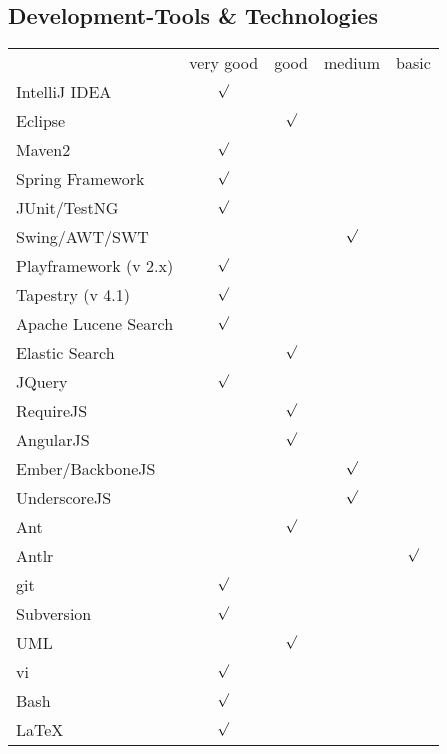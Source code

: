 \documentclass[11pt,a4paper,german]{moderncv}
\begin{document}
\subsection{Development-Tools \& Technologies}
{
\begin{tabular}{l*{4}{c}}
          & very good & good & medium & basic \\
IntelliJ IDEA & $ \surd $ & & & \\
Eclipse &  & $\surd$& &  \\
Maven2 &  $\surd$ & & & \\
Spring Framework &  $\surd$ & & & \\
JUnit/TestNG & $\surd$ & & &  \\
Swing/AWT/SWT & & & $\surd$ &  \\
Playframework (v 2.x)& $ \surd $ & & & \\
Tapestry (v 4.1) & $ \surd $ & & & \\
Apache Lucene Search & $ \surd $ & & & \\
Elastic Search & & $ \surd $ & & \\
JQuery & $ \surd $ & & & \\
RequireJS & & $ \surd $ & & \\
AngularJS & & $ \surd $ & & \\
Ember/BackboneJS & & & $ \surd $ & \\
UnderscoreJS & & & $ \surd $ & \\
Ant & & $\surd$& &  \\
Antlr & & & & $\surd$ \\
git & $\surd$ & & &  \\
Subversion & $\surd$ & & &  \\
UML & & $\surd$& &  \\
vi & $\surd$ &  & & \\
Bash & $\surd$ & & &  \\
\LaTeX & $\surd$ & & & \\
\end{tabular}
}{}




\end{document}
